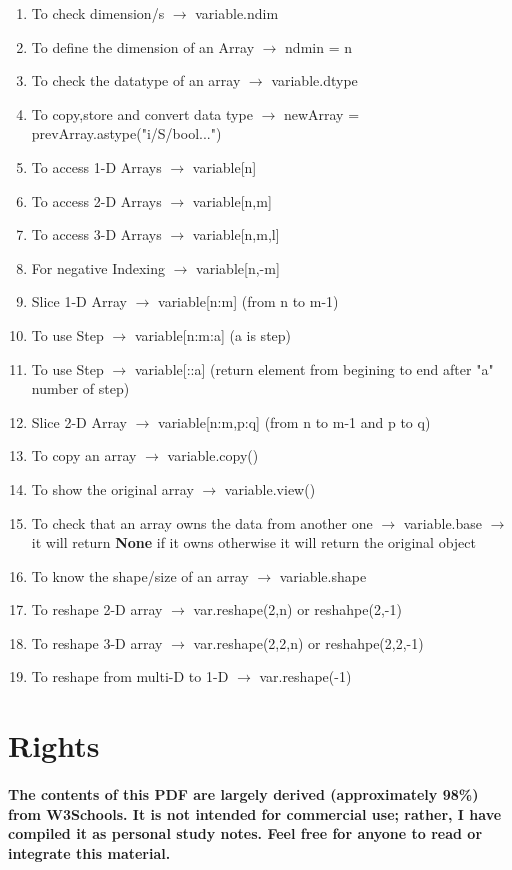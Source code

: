 \documentclass[openany]{book}
\begin{document}
\begin{enumerate}
    \item To check dimension/s $\rightarrow$ variable.ndim 
    \item To define the dimension of an Array $\rightarrow$ ndmin = n 
    \item To check the datatype of an array $\rightarrow$ variable.dtype
    \item To copy,store and convert data type $\rightarrow$ newArray = prevArray.astype("i/S/bool...")
    \item To access 1-D Arrays $\rightarrow$ variable[n]
    \item To access 2-D Arrays $\rightarrow$ variable[n,m]
    \item To access 3-D Arrays $\rightarrow$ variable[n,m,l]
    \item For negative Indexing $\rightarrow$ variable[n,-m]
    \item Slice 1-D Array $\rightarrow$ variable[n:m] (from n to m-1)
    \item To use Step $\rightarrow$ variable[n:m:a] (a is step)
    \item To use Step $\rightarrow$ variable[::a] (return element from begining to end after "a" number of step)
    \item Slice 2-D Array $\rightarrow$ variable[n:m,p:q] (from n to m-1 and p to q)
    \item To copy an array $\rightarrow$ variable.copy()
    \item To show the original array $\rightarrow$ variable.view()
    \item To check that an array owns the data from another one $\rightarrow$ variable.base $\rightarrow$ it will return \textbf{None} if it owns otherwise it will return the original object
    \item To know the shape/size of an array $\rightarrow$ variable.shape
    \item To reshape 2-D array $\rightarrow$ var.reshape(2,n) or reshahpe(2,-1)
    \item To reshape 3-D array $\rightarrow$ var.reshape(2,2,n) or reshahpe(2,2,-1)
    \item To reshape from multi-D to 1-D $\rightarrow$ var.reshape(-1)
\end{enumerate}
\newpage

\section{Rights}

\paragraph{The contents of this PDF are largely derived (approximately 98\%) from W3Schools. It is not intended for commercial use; rather, I have compiled it as personal study notes. Feel free for anyone to read or integrate this material.}

\cleardoublepage
\end{document}
